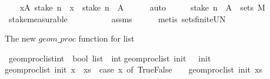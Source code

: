\begin{isabellebody}
\ \ \isamarkupfalse%
\ {\isachardoublequoteopen}{\isacharparenleft}{\kern0pt}{\isasymUnion}x{\isasymin}A{\isachardot}{\kern0pt}\ {\isacharparenleft}{\kern0pt}stake\ n\ {\isacharminus}{\kern0pt}{\isacharbackquote}{\kern0pt}\ {\isacharbraceleft}{\kern0pt}x{\isacharbraceright}{\kern0pt}{\isacharparenright}{\kern0pt}{\isacharparenright}{\kern0pt}\ {\isacharequal}{\kern0pt}\ {\isacharparenleft}{\kern0pt}stake\ n\ {\isacharminus}{\kern0pt}{\isacharbackquote}{\kern0pt}\ A{\isacharparenright}{\kern0pt}{\isachardoublequoteclose}\isanewline
\ \ \ \ \isamarkupfalse%
\ auto\isanewline
\ \ \isamarkupfalse%
\ \isamarkupfalse%
\ {\isachardoublequoteopen}{\isacharparenleft}{\kern0pt}stake\ n\ {\isacharminus}{\kern0pt}{\isacharbackquote}{\kern0pt}\ A{\isacharparenright}{\kern0pt}\ {\isasymin}\ sets\ M{\isachardoublequoteclose}\isanewline
\ \ \ \ \isamarkupfalse%
\ stake{\isacharunderscore}{\kern0pt}measurable\isanewline
\ \ \ \ \ \ \ \ \ \ assms\isanewline
\ \ \ \ \isamarkupfalse%
\ {\isacharparenleft}{\kern0pt}metis\ sets{\isachardot}{\kern0pt}finite{\isacharunderscore}{\kern0pt}UN{\isacharparenright}{\kern0pt}\isanewline
{}\isamarkupfalse%
%
\endisatagproof
{\isafoldproof}%
%
\isadelimproof
%
\endisadelimproof
%
\begin{isamarkuptext}%
The new $geom\_proc$ function for list%
\end{isamarkuptext}\isamarkuptrue%
\isamarkupfalse%
\ geom{\isacharunderscore}{\kern0pt}proc{\isacharunderscore}{\kern0pt}list{\isacharcolon}{\kern0pt}{\isacharcolon}{\kern0pt}{\isachardoublequoteopen}int\ {\isasymRightarrow}\ bool\ list\ {\isasymRightarrow}\ int{\isachardoublequoteclose}\isanewline
{\isachardoublequoteopen}geom{\isacharunderscore}{\kern0pt}proc{\isacharunderscore}{\kern0pt}list\ init\ {\isacharbrackleft}{\kern0pt}{\isacharbrackright}{\kern0pt}\ {\isacharequal}{\kern0pt}\ init{\isachardoublequoteclose}{\isacharbar}{\kern0pt}\isanewline
{\isachardoublequoteopen}geom{\isacharunderscore}{\kern0pt}proc{\isacharunderscore}{\kern0pt}list\ init\ {\isacharparenleft}{\kern0pt}x\ {\isacharhash}{\kern0pt}\ xs{\isacharparenright}{\kern0pt}\ {\isacharequal}{\kern0pt}\ {\isacharparenleft}{\kern0pt}case\ x\ of\ True{\isasymRightarrow}{}{\isacharbar}{\kern0pt}False\ {\isasymRightarrow}\ {\isacharminus}{\kern0pt}{}{\isacharparenright}{\kern0pt}\ {\isacharplus}{\kern0pt}\ geom{\isacharunderscore}{\kern0pt}proc{\isacharunderscore}{\kern0pt}list\ init\ xs{\isachardoublequoteclose}\isanewline

\end{isabellebody}
